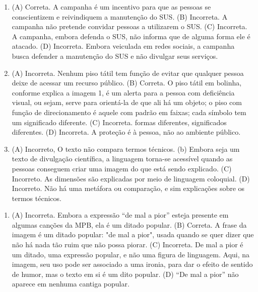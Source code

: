 \begin{enumerate}
\item (A) Correta. A campanha é um incentivo para que as pessoas se
conscientizem e reivindiquem a manutenção do SUS.
(B) Incorreta. A campanha não pretende convidar pessoas a utilizarem o
SUS.
(C) Incorreta. A campanha, embora defenda o SUS, não informa que de
alguma forma ele é atacado.
(D) Incorreta. Embora veiculada em redes sociais, a campanha busca
defender a manutenção do SUS e não divulgar seus serviços.

\item (A) Incorreta. Nenhum piso tátil tem função de evitar que qualquer pessoa
deixe de acessar um recurso público.
(B) Correta. O piso tátil em bolinha, conforme explica a imagem 1, é um
alerta para a pessoa com deficiência visual, ou sejam, serve para
orientá-la de que ali há um objeto; o piso com função de direcionamento
é aquele com padrão em faixas; cada símbolo tem um significado
diferente.
(C) Incorreta. formas diferentes, significados diferentes.
(D) Incorreta. A proteção é à pessoa, não ao ambiente público.

\item (A) Incorreto, O texto não compara termos técnicos.
(b) Embora seja um texto de divulgação científica, a linguagem torna-se
acessível quando as pessoas conseguem criar uma imagem do que está sendo
explicado.
(C) Incorreto. As dimensões são explicadas por meio de linguagem
coloquial.
(D) Incorreto. Não há uma metáfora ou comparação, e sim explicações sobre
os termos técnicos.
\end{enumerate}


\begin{enumerate}
\item (A) Incorreta. Embora a expressão ``de mal a pior'' esteja presente em
algumas canções da MPB, ela é um ditado popular.
(B) Correta. A frase da imagem é um ditado popular: "de mal a pior",
usada quando se quer dizer que não há nada tão ruim que não possa
piorar.
(C) Incorreta. De mal a pior é um ditado, uma expressão popular, e não
uma figura de linguagem. Aqui, na imagem, seu uso pode ser associado a
uma ironia, para dar o efeito de sentido de humor, mas o texto em si é
um dito popular.
(D) ``De mal a pior'' não aparece em nenhuma cantiga popular.
\end{enumerate}


